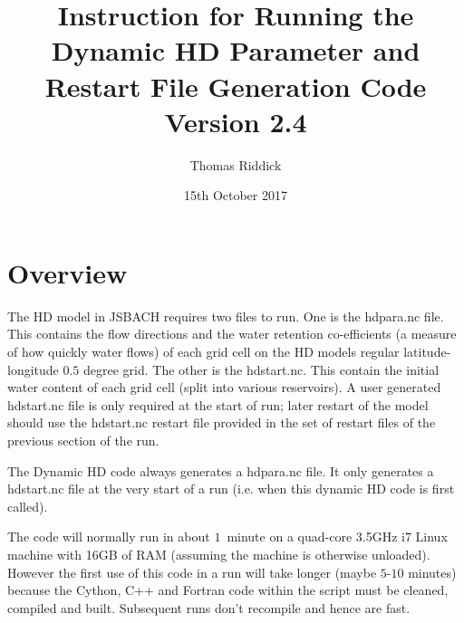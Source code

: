 \documentclass{article}
\title{Instruction for Running the Dynamic HD Parameter and Restart File Generation Code Version 2.4}
\author{Thomas Riddick}
\date{15th October 2017}
\begin{document}
\lstset{language=bash}
\maketitle
\section{Overview}
The HD model in JSBACH requires two files to run. One is the hdpara.nc file. This contains the flow directions and the water retention co-efficients (a measure of how quickly water flows) of each grid cell on the HD models regular latitude-longitude $0.5$ degree grid. The other is the hdstart.nc. This contain the initial water content of each grid cell (split into various reservoirs). A user generated hdstart.nc file is only required at the start of run; later restart of the model should use the hdstart.nc restart file provided in the set of restart files of the previous section of the run. 

The Dynamic HD code always generates a hdpara.nc file. It only generates a hdstart.nc file at the very start of a run (i.e. when this dynamic HD code is first called). 

The code will normally run in about $1$~minute on a quad-core  3.5GHz i7 Linux machine with 16GB of RAM (assuming the machine is otherwise unloaded). However the first use of this code in a run will take longer (maybe $5$-$10$ minutes) because the Cython, C++ and Fortran code within the script must be cleaned, compiled and built. Subsequent runs don't recompile and hence are fast. 
\end{document}
